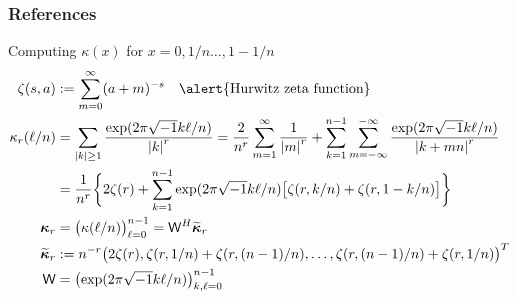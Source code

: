 \documentclass[10pt,compress,xcolor={usenames,dvipsnames},aspectratio=169]{beamer}
\newcommand{\talert}[1]{\alert{\text{#1}}}
\begin{document}
\thankyouframe


\begin{frame}
	\frametitle{References}
\printbibliography
\end{frame}





\begin{frame}{Computing $\kappa(x)$ for $x = 0, 1/n \ldots, 1-1/n$}
	\begin{align*}
	\zeta(s,a) &: = \sum_{m=0}^\infty (a+m)^{-s}  \quad \talert{Hurwitz zeta function}\\
	\kappa_r(\ell/n) & = \sum_{\abs{k} \ge 1} \frac{\exp(2\pi\sqrt{-1} k\ell/n)}{\abs{k}^{r}} 
	= \frac{2}{n^{r}}  \sum_{m=1}^\infty \frac{1}{\abs{m}^{r}} 
	+ 
	\sum_{k=1}^{n-1}  \sum_{m=-\infty}^{-\infty} \frac{\exp(2\pi\sqrt{-1} k\ell/n)}{\abs{k+mn}^{r}} 
	\\
	& = \frac{1}{n^{r}} \biggl\{2\zeta(r)
	+ 
	\sum_{k=1}^{n - 1} \exp(2\pi\sqrt{-1} k\ell/n) \bigl[ \zeta(r,k/n) + \zeta(r,1-k/n)\bigr] \biggr\} \\
	\vkappa_r & = \bigl( \kappa(\ell/n) \bigr)_{\ell = 0}^{n-1} = \mW^H \widetilde{\vkappa}_r \\
	\widetilde{\vkappa}_r & : = n^{-r}\bigl(2 \zeta(r), \zeta(r,1/n) + \zeta(r,(n-1)/n), \ldots, \zeta(r,(n-1)/n) + \zeta(r,1/n)  \bigr)^T \\
	\mW & = \bigl(\exp( 2 \pi \sqrt{-1} k \ell/n)\bigr)_{k,\ell =0}^{n-1}
	\end{align*}
\end{frame}
\end{document}
